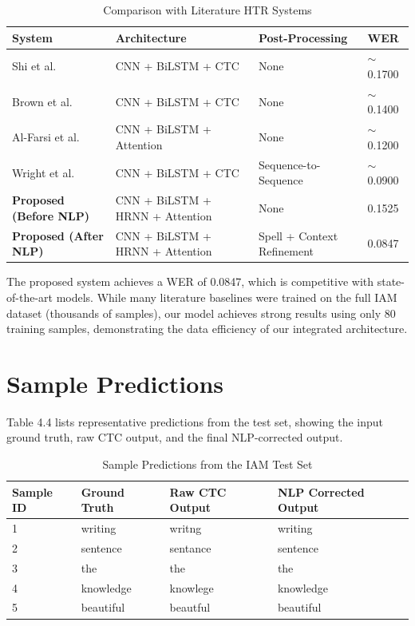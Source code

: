 \begin{table}[h!]
\centering
\caption{Comparison with Literature HTR Systems}
\label{tab:comparison}
\begin{tabular}{llll}
    \toprule
    \textbf{System} & \textbf{Architecture} & \textbf{Post-Processing} & \textbf{WER} \\
    \midrule
    Shi et al.~\cite{shi2017end} & CNN + BiLSTM + CTC & None & $\sim$0.1700 \\
    Brown et al.~\cite{study2023hybrid} & CNN + BiLSTM + CTC & None & $\sim$0.1400 \\
    Al-Farsi et al.~\cite{study2025arabic} & CNN + BiLSTM + Attention & None & $\sim$0.1200 \\
    Wright et al.~\cite{study2025nlp} & CNN + BiLSTM + CTC & Sequence-to-Sequence & $\sim$0.0900 \\
    \textbf{Proposed (Before NLP)} & CNN + BiLSTM + HRNN + Attention & None & 0.1525 \\
    \textbf{Proposed (After NLP)} & CNN + BiLSTM + HRNN + Attention & Spell + Context Refinement & 0.0847 \\
    \bottomrule
\end{tabular}
\end{table}

The proposed system achieves a WER of 0.0847, which is competitive with state-of-the-art models. While many literature baselines were trained on the full IAM dataset (thousands of samples), our model achieves strong results using only 80 training samples, demonstrating the data efficiency of our integrated architecture.

\section{Sample Predictions}
Table 4.4 lists representative predictions from the test set, showing the input ground truth, raw CTC output, and the final NLP-corrected output.

\begin{table}[h!]
\centering
\caption{Sample Predictions from the IAM Test Set}
\label{tab:samples}
\begin{tabular}{llll}
    \toprule
    \textbf{Sample ID} & \textbf{Ground Truth} & \textbf{Raw CTC Output} & \textbf{NLP Corrected Output} \\
    \midrule
    1 & writing & writng & writing \\
    2 & sentence & sentance & sentence \\
    3 & the & the & the \\
    4 & knowledge & knowlege & knowledge \\
    5 & beautiful & beautful & beautiful \\
    \bottomrule
\end{tabular}
\end{table}

